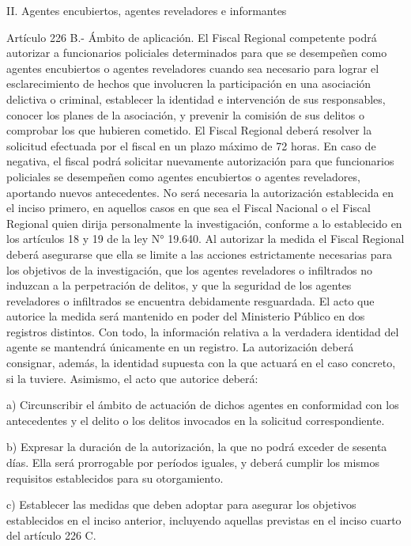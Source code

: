     II. Agentes encubiertos, agentes reveladores e informantes



    Artículo 226 B.- Ámbito de aplicación. El Fiscal Regional competente podrá autorizar a funcionarios policiales determinados para que se desempeñen como agentes encubiertos o agentes reveladores cuando sea necesario para lograr el esclarecimiento de hechos que involucren la participación en una asociación delictiva o criminal, establecer la identidad e intervención de sus responsables, conocer los planes de la asociación, y prevenir la comisión de sus delitos o comprobar los que hubieren cometido.
    El Fiscal Regional deberá resolver la solicitud efectuada por el fiscal en un plazo máximo de 72 horas. En caso de negativa, el fiscal podrá solicitar nuevamente autorización para que funcionarios policiales se desempeñen como agentes encubiertos o agentes reveladores, aportando nuevos antecedentes.
    No será necesaria la autorización establecida en el inciso primero, en aquellos casos en que sea el Fiscal Nacional o el Fiscal Regional quien dirija personalmente la investigación, conforme a lo establecido en los artículos 18 y 19 de la ley N° 19.640.     
    Al autorizar la medida el Fiscal Regional deberá asegurarse que ella se limite a las acciones estrictamente necesarias para los objetivos de la investigación, que los agentes reveladores o infiltrados no induzcan a la perpetración de delitos, y que la seguridad de los agentes reveladores o infiltrados se encuentra debidamente resguardada.
    El acto que autorice la medida será mantenido en poder del Ministerio Público en dos registros distintos. Con todo, la información relativa a la verdadera identidad del agente se mantendrá únicamente en un registro.
    La autorización deberá consignar, además, la identidad supuesta con la que actuará en el caso concreto, si la tuviere. Asimismo, el acto que autorice deberá:

    a) Circunscribir el ámbito de actuación de dichos agentes en conformidad con los antecedentes y el delito o los delitos invocados en la solicitud correspondiente.

    b) Expresar la duración de la autorización, la que no podrá exceder de sesenta días. Ella será prorrogable por períodos iguales, y deberá cumplir los mismos requisitos establecidos para su otorgamiento.

    c) Establecer las medidas que deben adoptar para asegurar los objetivos establecidos en el inciso anterior, incluyendo aquellas previstas en el inciso cuarto del artículo 226 C.

